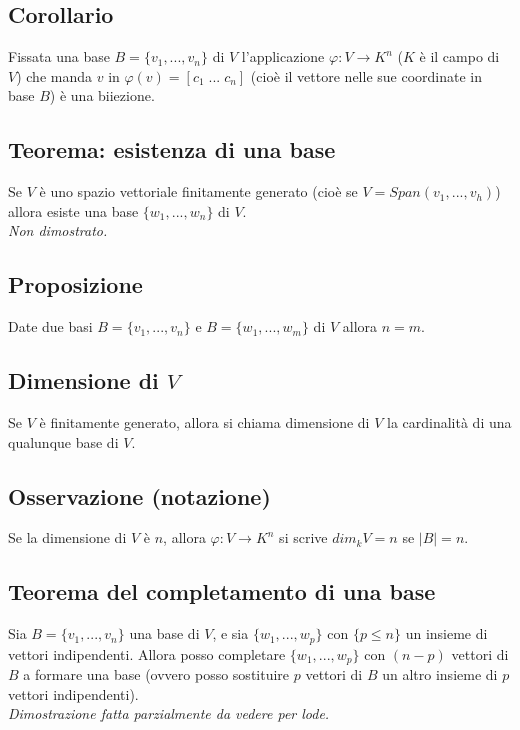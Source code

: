  \subsection{Corollario}
 Fissata una base $B=\{v_1,...,v_n\}$ di $V$ l'applicazione $\varphi : V\rightarrow K^n$ ($K$ è il campo di $V$) che manda $v$ in $\varphi (v)=[c_1\;...\;c_n]$ (cioè il vettore nelle sue coordinate in base $B$) è una biiezione.

 \subsection{Teorema: esistenza di una base}
 Se $V$ è uno spazio vettoriale finitamente generato (cioè se $V=Span(v_1,...,v_h)$) allora esiste una base $\{w_1,...,w_n\}$ di $V$.
 \\\textit{Non dimostrato.}

 \subsection{Proposizione}
 Date due basi $B=\{v_1,...,v_n\}$ e $B=\{w_1,...,w_m\}$ di $V$ allora $n=m$.

 \subsection{Dimensione di $V$}
 Se $V$ è finitamente generato, allora si chiama dimensione di $V$ la cardinalità di una qualunque base di $V$.

 \subsection{Osservazione (notazione)}
 Se la dimensione di $V$ è $n$, allora $\varphi :V\rightarrow K^n$ si scrive $dim_kV=n$ se $|B|=n$.

 \subsection{Teorema del completamento di una base}
 Sia $B=\{v_1,...,v_n\}$ una base di $V$, e sia $\{w_1,...,w_p\}$ con $\{p\leq n\}$ un insieme di vettori indipendenti. Allora posso completare $\{w_1,...,w_p\}$ con $(n-p)$ vettori di $B$ a formare una base (ovvero posso sostituire $p$ vettori di $B$ un altro insieme di $p$ vettori indipendenti).
 \\\textit{Dimostrazione fatta parzialmente da vedere per lode.}

